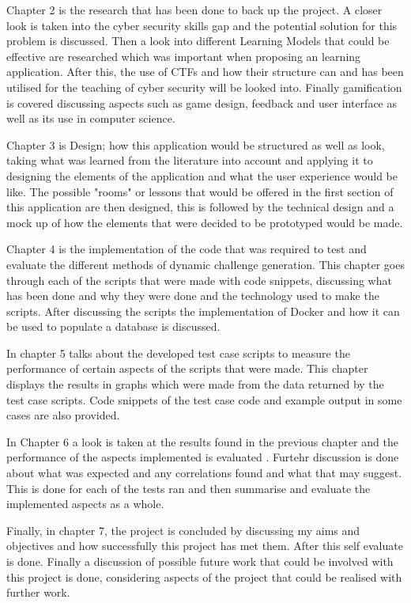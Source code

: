 \documentclass[12pt,a4paper]{article}
\begin{document}
Chapter 2 is the research that has been done to back up the project. A closer look is taken into the cyber security skills gap and the potential solution for this problem is discussed. Then a look into different Learning Models that could be effective are researched which was important when proposing an learning application. After this, the use of CTFs and how their structure can and has been utilised for the teaching of cyber security will be looked into. Finally gamification is covered discussing aspects such as game design, feedback and user interface as well as its use in computer science.  

Chapter 3 is Design; how this application would be structured as well as look, taking what was learned from the literature into account and applying it to designing the elements of the application and what the user experience would be like. The possible "rooms" or lessons that would be offered in the first section of this application are then designed, this is followed by the technical design and a mock up of how the elements that were decided to be prototyped would be made.  

Chapter 4 is the implementation of the code that was required to test and evaluate the different methods of dynamic challenge generation. This chapter goes through each of the scripts that were made with code snippets, discussing what has been done and why they were done and the technology used to make the scripts. After discussing the scripts the implementation of Docker and how it can be used to populate a database is discussed.  

In chapter 5 talks about the developed test case scripts to measure the performance of certain aspects of the scripts that were made. This chapter displays the results in graphs which were made from the data returned by the test case scripts. Code snippets of the test case code and example output in some cases are also provided. 

In Chapter 6  a look is taken at the results found in the previous chapter and the performance of the aspects implemented is evaluated . Furtehr discussion is done about what was expected and any correlations found and what that may suggest. This is done for each of the tests ran and then summarise and evaluate the implemented aspects as a whole. 

Finally, in chapter 7, the project is concluded by discussing my aims and objectives and how successfully this project has met them. After this self evaluate is done. Finally a discussion of possible future work that could be involved with this project is done, considering aspects of the project that could be realised with further work.
\end{document}
